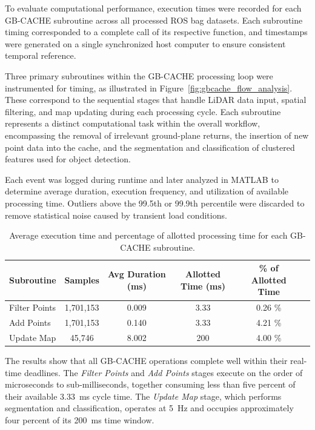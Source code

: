 To evaluate computational performance, execution times were recorded for each GB-CACHE subroutine across all processed ROS bag datasets. 
Each subroutine timing corresponded to a complete call of its respective function, and timestamps were generated on a single synchronized host computer to ensure consistent temporal reference.

Three primary subroutines within the GB-CACHE processing loop were instrumented for timing, as illustrated in Figure~\ref{fig:gbcache_flow_analysis}. 
These correspond to the sequential stages that handle LiDAR data input, spatial filtering, and map updating during each processing cycle. 
Each subroutine represents a distinct computational task within the overall workflow, encompassing the removal of irrelevant ground-plane returns, the insertion of new point data into the cache, and the segmentation and classification of clustered features used for object detection.

Each event was logged during runtime and later analyzed in MATLAB to determine average duration, execution frequency, and utilization of available processing time. 
Outliers above the 99.5th or 99.9th percentile were discarded to remove statistical noise caused by transient load conditions.

\begin{table}[htbp]
\centering
\begin{tabular}{lccccc}
\hline
Subroutine & Samples & Avg Duration (ms) & Allotted Time (ms) & \% of Allotted Time\\
\hline
Filter Points & 1,701,153 & 0.009 &  3.33 & 0.26 \% \\
Add Points & 1,701,153 & 0.140 &  3.33 & 4.21 \% \\
Update Map & 45,746 & 8.002 & 200 & 4.00 \% \\
\hline
\end{tabular}
\caption{Average execution time and percentage of allotted processing time for each GB-CACHE subroutine.}
\label{tbl:gbcache_subroutine_results}
\end{table}

The results show that all GB-CACHE operations complete well within their real-time deadlines. 
The \textit{Filter Points} and \textit{Add Points} stages execute on the order of microseconds to sub-milliseconds, together consuming less than five percent of their available 3.33~ms cycle time. 
The \textit{Update Map} stage, which performs segmentation and classification, operates at 5~Hz and occupies approximately four percent of its 200~ms time window.

